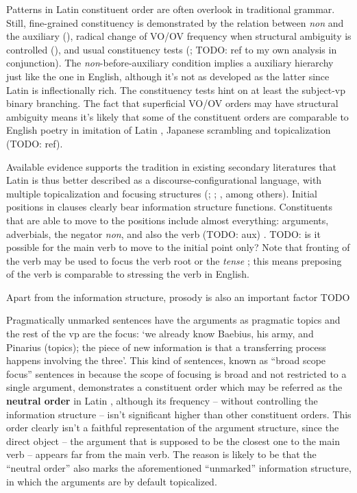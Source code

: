 \documentclass[a4paper, oneside, 12pt]{report}
\newcommand*{\citesec}[1]{\S~{#1}}
\newcommand*{\citepage}[1]{p.~{#1}}
\newcommand*{\concept}[1]{\textbf{#1}}
\newcommand{\form}[1]{\emph{#1}}
\newcommand{\translate}[1]{`#1'}
\begin{document}
Patterns in Latin constituent order are often overlook in traditional grammar.
Still, fine-grained constituency is demonstrated by 
the relation between \form{non} and the auxiliary 
(),
radical change of VO/OV frequency when structural ambiguity is controlled
(),
and usual constituency tests 
(\citealt[\citesec{1.6}]{danckaert2017development}; TODO: ref to my own analysis in conjunction).
The \form{non}-before-auxiliary condition implies 
a auxiliary hierarchy just like the one in English, 
although it's not as developed as the latter 
since Latin is inflectionally rich.
The constituency tests hint on 
at least the subject-\acs{vp} binary branching.
The fact that superficial VO/OV orders may have structural ambiguity 
means it's likely that some of the constituent orders 
are comparable to
English poetry in imitation of Latin \citep[\citesec{600}]{allen1903allen},
Japanese scrambling and topicalization (TODO: ref).

Available evidence supports the tradition in existing secondary literatures that
Latin is thus better described as a discourse-configurational language,
with multiple topicalization and focusing structures
(\citealt[\citepage{189}]{oniga2014latin}; 
\citealt[\citepage{77}]{danckaert2017development}; 
\citealt{devine2006latin}, among others).
Initial positions in clauses clearly bear information structure functions. 
Constituents that are able to move to the positions 
include almost everything: 
arguments, adverbials, the negator \form{non}, 
and also the verb (TODO: aux) 
\citep[\citesec{598}]{allen1903allen}. 
TODO: is it possible for the main verb to move to the initial point only?
Note that fronting of the verb may be used 
to focus the verb root or the \emph{tense}
\citep[\citepage{397}]{allen1903allen};
this means preposing of the verb is comparable to 
stressing the verb in English.

Apart from the information structure, 
prosody is also an important factor TODO

Pragmatically unmarked sentences have the arguments as pragmatic topics 
and the rest of the \acs{vp} are the focus:
\translate{we already know Baebius, his army, and Pinarius (topics);
the piece of new information is that 
a transferring process happens involving the three}.
This kind of sentences, known as ``broad scope focus'' sentences 
in \citet[\citepage{15}]{devine2006latin}
because the scope of focusing is broad
and not restricted to a single argument,
demonstrates a constituent order which may be referred as the \concept{neutral order} in Latin
\citep[\citepage{79}]{devine2006latin},
although its frequency -- without controlling the information structure -- 
isn't significant higher than other constituent orders.
This order clearly isn't a faithful representation 
of the argument structure, 
since the direct object -- the argument that is supposed to be the closest one to the main verb -- 
appears far from the main verb. 
The reason is likely to be that the ``neutral order'' also marks 
the aforementioned ``unmarked'' information structure, 
in which the arguments are by default topicalized.
\end{document}
